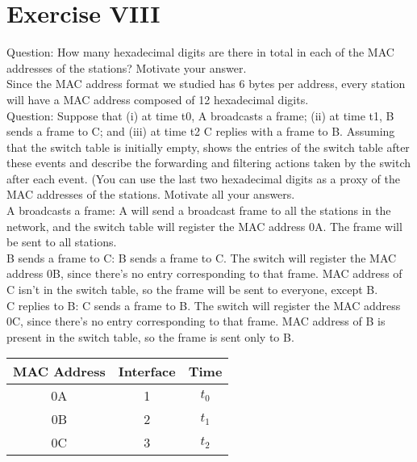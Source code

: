 \documentclass[11pt]{article}
\begin{document}
	\section*{Exercise VIII}
	Question:
	How many hexadecimal digits are there in total in each of the MAC addresses of the stations? Motivate your answer.\\
	Since the MAC address format we studied has 6 bytes per address, every station will have a MAC address composed of 12 hexadecimal digits.\\
	Question:
	Suppose that (i) at time t0, A broadcasts a frame; (ii) at time t1, B sends a frame to C; and (iii) at time t2 C replies with a frame to B. Assuming that the switch table is initially empty, shows the entries of the switch table after these events and describe the forwarding and filtering actions taken by the switch after each event. (You can use the last two hexadecimal digits as a proxy of the MAC addresses of the stations. Motivate all your answers.\\
	A broadcasts a frame: A will send a broadcast frame to all the stations in the network, and the switch table will register the MAC address 0A. The frame will be sent to all stations.\\
	B sends a frame to C: B sends a frame to C. The switch will register the MAC address 0B, since there's no entry corresponding to that frame. MAC address of C isn't in the switch table, so the frame will be sent to everyone, except B.\\
	C replies to B: C sends a frame to B. The switch will register the MAC address 0C, since there's no entry corresponding to that frame. MAC address of B is present in the switch table, so the frame is sent only to B.
	\begin{center}
    \begin{tabular}{|c c c|}
    \hline
    MAC Address & Interface & Time \\ [0.5ex]
    \hline\hline
    0A & 1 & $t_0$ \\
     \hline
    0B & 2 & $t_1$ \\
     \hline
    0C & 3 & $t_2$ \\
     \hline
    \end{tabular}
    \end{center}
\end{document}
